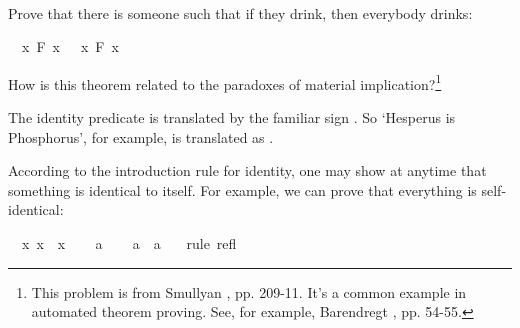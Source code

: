 \begin{isabellebody}
\isadelimproof
\ %
\endisadelimproof
%
\isatagproof
{}\isamarkupfalse%
%
\endisatagproof
{\isafoldproof}%
%
\isadelimproof
%
\endisadelimproof
%
\begin{isamarkuptext}%
\begin{Exercise}[title = {The Drinker Principle}]\label{drinker} 
Prove that there is someone such that if they drink, then everybody drinks: \end{Exercise}%
\end{isamarkuptext}\isamarkuptrue%
\isamarkupfalse%
\ {\isachardoublequoteopen}{\isasymexists}\ x{\isachardot}\ F\ x\ {\isasymlongrightarrow}\ {\isacharparenleft}{\isasymforall}\ x{\isachardot}\ F\ x{\isacharparenright}{\isachardoublequoteclose}%
\isadelimproof
\ %
\endisadelimproof
%
\isatagproof
{}\isamarkupfalse%
%
\endisatagproof
{\isafoldproof}%
%
\isadelimproof
%
\endisadelimproof
%
\begin{isamarkuptext}%
How is this theorem related to the paradoxes of material implication?\footnote{This problem
is from Smullyan \cite{smullyan_what_1978}, pp. 209-11. It's a common example in automated theorem
proving. See, for example, Barendregt \cite{barendregt_quest_1996}, pp. 54-55.}%
\end{isamarkuptext}\isamarkuptrue%
%
\isamarkuptrue%
%
\begin{isamarkuptext}%
The identity predicate is translated by the familiar sign \isa{{\isacharequal}}. So `Hesperus is Phosphorus',
for example, is translated as .%
\end{isamarkuptext}\isamarkuptrue%
%
\isamarkuptrue%
%
\begin{isamarkuptext}%
According to the introduction rule for identity, one may show at anytime that something is
identical to itself. For example, we can prove that everything is self-identical:%
\end{isamarkuptext}\isamarkuptrue%
\isamarkupfalse%
\ {\isachardoublequoteopen}{\isasymforall}\ x{\isachardot}\ x\ {\isacharequal}\ x{\isachardoublequoteclose}\isanewline
%
\isadelimproof
%
\endisadelimproof
%
\isatagproof
{}\isamarkupfalse%
\isanewline
\ \ \isamarkupfalse%
\ a\isanewline
\ \ \isamarkupfalse%
\ {\isachardoublequoteopen}a\ {\isacharequal}\ a\ {\isachardoublequoteclose}\ \isamarkupfalse%
\ {\isacharparenleft}rule\ refl{\isacharparenright}\isanewline
{}\isamarkupfalse%

\end{isabellebody}

